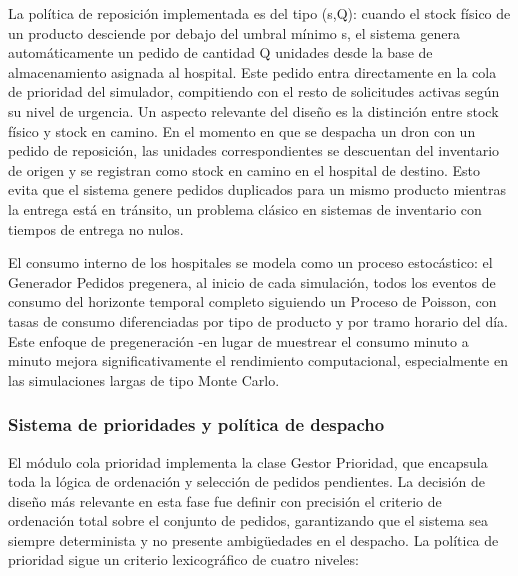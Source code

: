 \documentclass[11pt, a4paper]{article} %
\begin{document}
La política de reposición implementada es del tipo (s,Q): cuando el stock físico de un producto desciende por debajo del umbral mínimo s, el sistema genera automáticamente un pedido de cantidad Q unidades desde la base de almacenamiento asignada al hospital. Este pedido entra directamente en la cola de prioridad del simulador, compitiendo con el resto de solicitudes activas según su nivel de urgencia. Un aspecto relevante del diseño es la distinción entre stock físico y stock en camino. En el momento en que se despacha un dron con un pedido de reposición, las unidades correspondientes se descuentan del inventario de origen y se registran como stock en camino en el hospital de destino. Esto evita que el sistema genere pedidos duplicados para un mismo producto mientras la entrega está en tránsito, un problema clásico en sistemas de inventario con tiempos de entrega no nulos.

El consumo interno de los hospitales se modela como un proceso estocástico: el Generador Pedidos pregenera, al inicio de cada simulación, todos los eventos de consumo del horizonte temporal completo siguiendo un Proceso de Poisson, con tasas de consumo diferenciadas por tipo de producto y por tramo horario del día. Este enfoque de pregeneración -en lugar de muestrear el consumo minuto a minuto mejora significativamente el rendimiento computacional, especialmente en las simulaciones largas de tipo Monte Carlo.

\subsubsection{Sistema de prioridades y política de despacho}
El módulo cola prioridad implementa la clase Gestor Prioridad, que encapsula toda la lógica de ordenación y selección de pedidos pendientes. La decisión de diseño más relevante en esta fase fue definir con precisión el criterio de ordenación total sobre el conjunto de pedidos, garantizando que el sistema sea siempre determinista y no presente ambigüedades en el despacho. La política de prioridad sigue un criterio lexicográfico de cuatro niveles:
\end{document}
